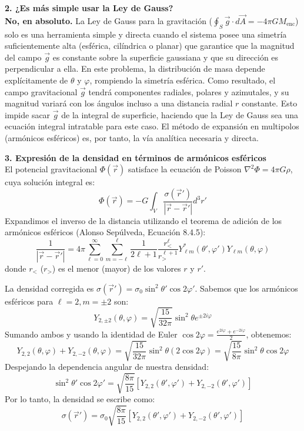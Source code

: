 \documentclass[a4paper]{article}
\begin{document}
\vspace{0.3cm}
\noindent\textbf{2. ¿Es más simple usar la Ley de Gauss?} \\
\textbf{No, en absoluto.} La Ley de Gauss para la gravitación ($\oint_S \vec{g} \cdot d\vec{A} = -4\pi G M_{\text{enc}}$) solo es una herramienta simple y directa cuando el sistema posee una simetría suficientemente alta (esférica, cilíndrica o planar) que garantice que la magnitud del campo $\vec{g}$ es constante sobre la superficie gaussiana y que su dirección es perpendicular a ella. 
En este problema, la distribución de masa depende explícitamente de $\theta$ y $\varphi$, rompiendo la simetría esférica. Como resultado, el campo gravitacional $\vec{g}$ tendrá componentes radiales, polares y azimutales, y su magnitud variará con los ángulos incluso a una distancia radial $r$ constante. Esto impide sacar $\vec{g}$ de la integral de superficie, haciendo que la Ley de Gauss sea una ecuación integral intratable para este caso. El método de expansión en multipolos (armónicos esféricos) es, por tanto, la vía analítica necesaria y directa.

\vspace{0.3cm}
\noindent\textbf{3. Expresión de la densidad en términos de armónicos esféricos} \\
El potencial gravitacional $\Phi(\vec{r})$ satisface la ecuación de Poisson $\nabla^2 \Phi = 4\pi G \rho$, cuya solución integral es:
$$
\Phi(\vec{r}) = -G \int_V \frac{\sigma(\vec{r}')}{|\vec{r} - \vec{r}'|} d^3r'
$$
Expandimos el inverso de la distancia utilizando el teorema de adición de los armónicos esféricos (Alonso Sepúlveda, Ecuación 8.4.5):
$$
\frac{1}{|\vec{r} - \vec{r}'|} = 4\pi \sum_{\ell=0}^{\infty} \sum_{m=-\ell}^{\ell} \frac{1}{2\ell+1} \frac{r_{<}^\ell}{r_{>}^{\ell+1}} Y_{\ell m}^*(\theta', \varphi') Y_{\ell m}(\theta, \varphi)
$$
donde $r_{<}$ ($r_{>}$) es el menor (mayor) de los valores $r$ y $r'$. 

La densidad corregida es $\sigma(\vec{r}') = \sigma_0 \sin^2\theta' \cos 2\varphi'$. Sabemos que los armónicos esféricos para $\ell=2, m=\pm 2$ son:
$$
Y_{2, \pm 2}(\theta, \varphi) = \sqrt{\frac{15}{32\pi}} \sin^2\theta e^{\pm 2i\varphi}
$$
Sumando ambos y usando la identidad de Euler $\cos 2\varphi = \frac{e^{2i\varphi} + e^{-2i\varphi}}{2}$, obtenemos:
$$
Y_{2, 2}(\theta, \varphi) + Y_{2, -2}(\theta, \varphi) = \sqrt{\frac{15}{32\pi}} \sin^2\theta (2 \cos 2\varphi) = \sqrt{\frac{15}{8\pi}} \sin^2\theta \cos 2\varphi
$$
Despejando la dependencia angular de nuestra densidad:
$$
\sin^2\theta' \cos 2\varphi' = \sqrt{\frac{8\pi}{15}} \left[ Y_{2, 2}(\theta', \varphi') + Y_{2, -2}(\theta', \varphi') \right]
$$
Por lo tanto, la densidad se escribe como:
$$
\sigma(\vec{r}') = \sigma_0 \sqrt{\frac{8\pi}{15}} \left[ Y_{2, 2}(\theta', \varphi') + Y_{2, -2}(\theta', \varphi') \right]
$$
\end{document}
